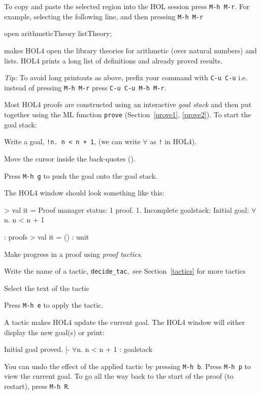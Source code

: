 \documentclass[a4paper,10pt]{article}
\begin{document}
To copy and paste the selected region into the HOL session press {\tt M-h~M-r}.
For example, selecting the following line, and then pressing {\tt M-h M-r}
\begin{code}
open arithmeticTheory listTheory;
\end{code}
makes HOL4 open the library theories for arithmetic (over natural numbers)
and lists. HOL4 prints a long list of definitions and already proved results.

\noindent\rule{0em}{1.5em}\emph{Tip:} To avoid long printouts as above, prefix your command with
{\tt C-u C-u} i.e. instead of pressing {\tt M-h M-r} press
{\tt C-u C-u M-h M-r}.


Most HOL4 proofs are constructed using an interactive \emph{goal
  stack} and then put together using the ML function {\tt prove}
(Section~\ref{prove1}, \ref{prove2}). To start the goal stack:
\begin{enum}
\item Write a goal, \eg{} {\tt \sq !n{.}~n~<~n~+~1\sq}, (we can write $\forall$ as {\tt !} in HOL4).
\item Move the cursor inside the back-quotes ({\tt \sq}).
\item Press {\tt M-h~g} to push the goal onto the goal stack.
\end{enum}
The HOL4 window should look something like this:
\begin{code}
> val it =
     Proof manager status: 1 proof.
  1. Incomplete goalstack:
       Initial goal:
       \(\forall\)n. n < n + 1

   : proofs
> val it = () : unit
\end{code}


Make progress in a proof using \emph{proof tactics}.

\begin{enum}
\item Write the name of a tactic, \eg{} {\tt decide\_tac},~see Section~\ref{tactics} for more tactics
\item Select the text of the tactic
\item Press {\tt M-h~e} to apply the tactic.
\end{enum}
A tactic makes HOL4 update the current goal. The HOL4 window will either
display the new goal(s) or print:
\begin{code}
    Initial goal proved.
    |- \(\forall\)n. n < n + 1 : goalstack
\end{code}
You can undo the effect of the applied tactic by pressing {\tt M-h b}. Press {\tt M-h p} to view the current goal.
To go all the way back to the start of the proof (to restart), press \texttt{M-h~R}.
\end{document}
